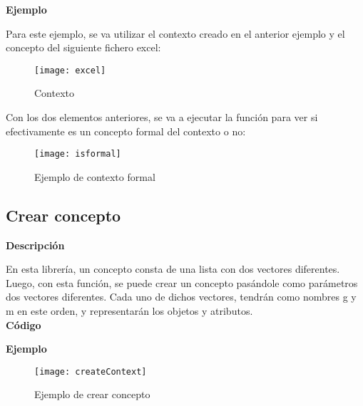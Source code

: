         

        \bigskip

        \textbf{Ejemplo}

        Para este ejemplo, se va utilizar el contexto creado en el anterior ejemplo y el concepto del siguiente fichero excel:

        \begin{figure}[H]
            \centering
            \texttt{[image: excel]}
            \caption{Contexto}
            \label{fig:excel}
        \end{figure}


        Con los dos elementos anteriores, se va a ejecutar la funci\'on para ver si efectivamente es un concepto formal del contexto o no:

        \begin{figure}[H]
            \centering
            \texttt{[image: isformal]}
            \caption{Ejemplo de contexto formal}
            \label{fig:isformal}
        \end{figure}

        \clearpage



    \subsection{Crear concepto}

        \textbf{Descripci\'on}

        En esta librer\'ia, un concepto consta de una lista con dos vectores diferentes. Luego, con esta funci\'on, se puede crear un concepto 
        pas\'andole como par\'ametros dos vectores diferentes.
        Cada uno de dichos vectores, tendr\'an como nombres g y m en este orden, y representar\'an los objetos y atributos.
        \\
        

        \textbf{C\'odigo}

        

        \bigskip

        \textbf{Ejemplo}

        \begin{figure}[H]
            \centering
            \texttt{[image: createContext]}
            \caption{Ejemplo de crear concepto}
            \label{fig:createContext}
        \end{figure}




